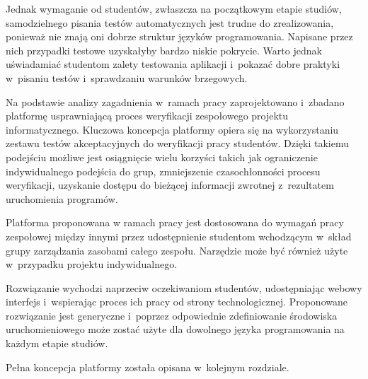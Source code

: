 Jednak wymaganie od studentów, zwłaszcza na początkowym etapie studiów, samodzielnego pisania testów automatycznych jest trudne do zrealizowania, ponieważ nie znają oni dobrze struktur języków programowania.
Napisane przez nich przypadki testowe uzyskałyby bardzo niskie pokrycie.
Warto jednak uświadamiać studentom zalety testowania aplikacji i~pokazać dobre praktyki w~pisaniu testów i~sprawdzaniu warunków brzegowych.

Na podstawie analizy zagadnienia w~ramach pracy zaprojektowano i~zbadano platformę usprawniającą proces weryfikacji zespołowego projektu informatycznego.
Kluczowa koncepcja platformy opiera się na wykorzystaniu zestawu testów akceptacyjnych do weryfikacji pracy studentów.
Dzięki takiemu podejściu możliwe jest osiągnięcie wielu korzyści takich jak ograniczenie indywidualnego podejścia do grup, zmniejszenie czasochłonności procesu weryfikacji, uzyskanie dostępu do bieżącej informacji zwrotnej z~rezultatem uruchomienia programów.

Platforma proponowana w ramach pracy jest dostosowana do wymagań pracy zespołowej między innymi przez udostępnienie studentom wchodzącym w~skład grupy zarządzania zasobami całego zespołu.
Narzędzie może być również użyte w~przypadku projektu indywidualnego.

Rozwiązanie wychodzi naprzeciw oczekiwaniom studentów, udostępniając webowy interfejs i~wspierając proces ich pracy od strony technologicznej.
Proponowane rozwiązanie jest generyczne i~poprzez odpowiednie zdefiniowanie środowiska uruchomieniowego może zostać użyte dla dowolnego języka programowania na każdym etapie studiów.


Pełna koncepcja platformy została opisana w~kolejnym rozdziale.




